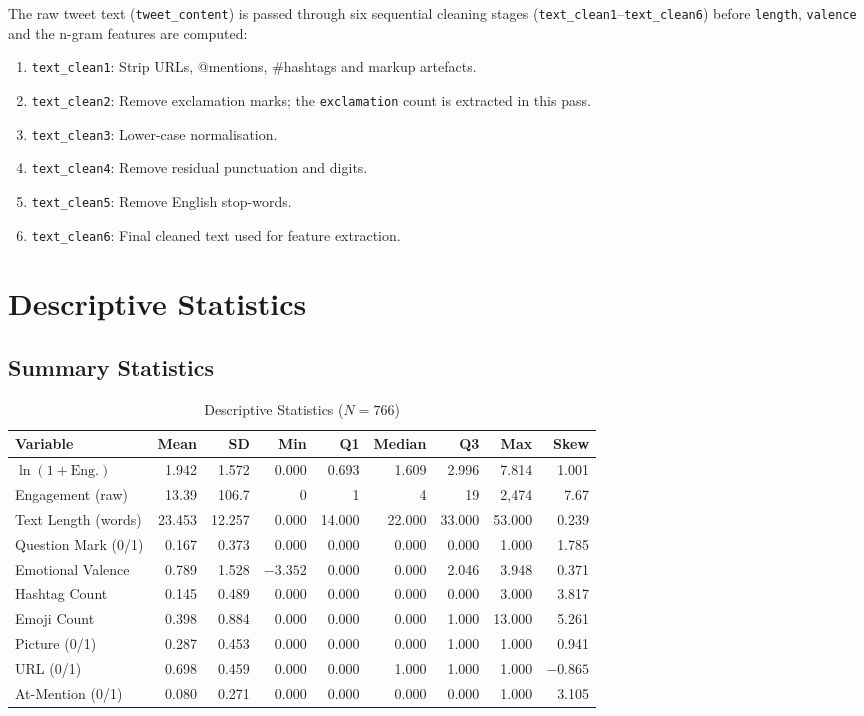 \documentclass[12pt,a4paper]{article}
\begin{document}
The raw tweet text (\texttt{tweet\_content}) is passed through six sequential cleaning stages (\texttt{text\_clean1}--\texttt{text\_clean6}) before \texttt{length}, \texttt{valence} and the n-gram features are computed:

\begin{enumerate}
    \item \texttt{text\_clean1}: Strip URLs, @mentions, \#hashtags and markup artefacts.
    \item \texttt{text\_clean2}: Remove exclamation marks; the \texttt{exclamation} count is extracted in this pass.
    \item \texttt{text\_clean3}: Lower-case normalisation.
    \item \texttt{text\_clean4}: Remove residual punctuation and digits.
    \item \texttt{text\_clean5}: Remove English stop-words.
    \item \texttt{text\_clean6}: Final cleaned text used for feature extraction.
\end{enumerate}

\newpage

\section{Descriptive Statistics}

\subsection{Summary Statistics}

\begin{table}[H]
\centering
\caption{Descriptive Statistics ($N=766$)}
\label{tab:desc_full}
\small
\begin{tabular}{lrrrrrrrr}
\toprule
Variable & Mean & SD & Min & Q1 & Median & Q3 & Max & Skew \\
\midrule
$\ln(1+\text{Eng.})$ & 1.942 & 1.572 & 0.000 & 0.693 & 1.609 & 2.996 & 7.814 & 1.001 \\
Engagement (raw) & 13.39 & 106.7 & 0 & 1 & 4 & 19 & 2{,}474 & 7.67 \\
Text Length (words) & 23.453 & 12.257 & 0.000 & 14.000 & 22.000 & 33.000 & 53.000 & 0.239 \\
Question Mark (0/1) & 0.167 & 0.373 & 0.000 & 0.000 & 0.000 & 0.000 & 1.000 & 1.785 \\
Emotional Valence & 0.789 & 1.528 & $-3.352$ & 0.000 & 0.000 & 2.046 & 3.948 & 0.371 \\
Hashtag Count & 0.145 & 0.489 & 0.000 & 0.000 & 0.000 & 0.000 & 3.000 & 3.817 \\
Emoji Count & 0.398 & 0.884 & 0.000 & 0.000 & 0.000 & 1.000 & 13.000 & 5.261 \\
Picture (0/1) & 0.287 & 0.453 & 0.000 & 0.000 & 0.000 & 1.000 & 1.000 & 0.941 \\
URL (0/1) & 0.698 & 0.459 & 0.000 & 0.000 & 1.000 & 1.000 & 1.000 & $-0.865$ \\
At-Mention (0/1) & 0.080 & 0.271 & 0.000 & 0.000 & 0.000 & 0.000 & 1.000 & 3.105 \\
\bottomrule
\end{tabular}
\end{table}
\end{document}
